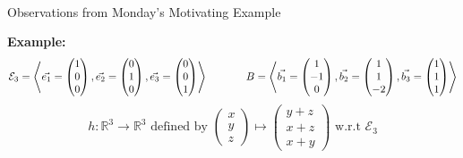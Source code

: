 \documentclass[11pt,fleqn]{article}
\begin{document}
\renewcommand{\headrulewidth}{0pt}
\newcommand{\blank}[1]{\rule{#1}{0.75pt}}
\renewcommand{\d}{\displaystyle}

\newcommand{\bpm}{\begin{pmatrix}}
\newcommand{\epm}{\end{pmatrix}}
\newcommand{\bbm}{\begin{bmatrix}}
\newcommand{\ebm}{\end{bmatrix}}

\vspace*{-0.7in}

\begin{center}
  \large {}\\
  
  Observations from Monday's Motivating Example
\end{center}
\textbf{Example:}  $$\mathcal{E}_3=\left\langle \vec{e_1}=\bpm 1\\0\\0 \epm,\vec{e_2}=\bpm 0\\1\\0\epm,\vec{e_3}=\bpm 0\\0\\1 \epm \right\rangle \hspace{.5in} B=\left\langle \vec{b_1}=\bpm 1\\-1\\0\epm, \vec{b_2}=\bpm1\\1\\-2 \epm, \vec{b_3}=\bpm 1\\1\\1\epm \right\rangle$$ 
$$h:\mathbb{R}^3 \to \mathbb{R}^3 \text{ defined by } \bpm x\\y\\z \epm \mapsto \bpm y+z \\ x+z \\ x+y \epm \text{ w.r.t } \mathcal{E}_3$$ 
\end{document}
